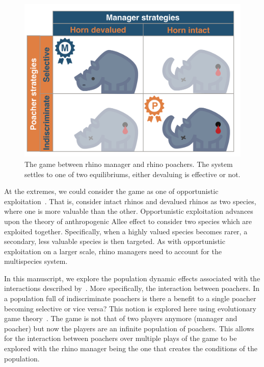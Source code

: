\documentclass[10pt]{article}
\begin{document}
\begin{figure}[!htbp]
    \centering
    \includegraphics[scale=0.2]{images/RhinoPic.pdf}
    \caption{\label{fig:RhinoPic} The game between rhino manager and rhino
    poachers. The system settles to one of two equilibriums, either devaluing is effective or not.}
\end{figure}

At the extremes, we could consider the game as one of opportunistic exploitation~\cite{branch2013opportunistic}.
That is, consider intact rhinos and devalued rhinos as two species, where one is more valuable than
the other. Opportunistic exploitation advances upon the theory of anthropogenic Allee
effect to consider two species which are exploited together. Specifically, when a
highly valued species becomes rarer, a secondary, less valuable species is then targeted.
As with opportunistic exploitation on a larger scale, rhino managers need to account for
the multispecies system.

In this manuscript, we explore the population dynamic effects associated with
the interactions described by~\cite{Lee}. More specifically, the interaction between
poachers. In a population full of indiscriminate poachers is there
a benefit to a single poacher becoming selective or vice versa? This notion
is explored here using evolutionary game theory~\cite{Smith}. The
game is not that of two players anymore (manager and poacher) but now the players
are an infinite population of poachers. This allows for the interaction between
poachers over multiple plays of the game to be explored with the rhino manager
being the one that creates the conditions of the population.
\end{document}
